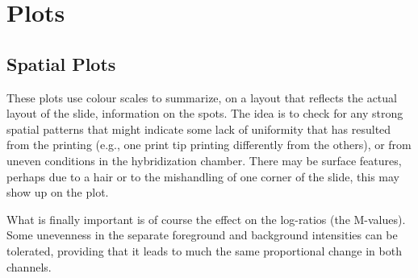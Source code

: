 \documentclass[a4paper,9pt]{article}\usepackage[]{graphicx}\usepackage[]{xcolor}
\begin{document}
\section{Plots}

\subsection{Spatial Plots}
These plots use colour scales to summarize, on a layout that reflects
the actual layout of the slide, information on the spots.  The idea is
to check for any strong spatial patterns that might indicate some lack
of uniformity that has resulted from the printing (e.g., one print tip
printing differently from the others), or from uneven conditions in
the hybridization chamber.  There may be surface features, perhaps due
to a hair or to the mishandling of one corner of the slide, this may
show up on the plot.

What is finally important is of course the effect on the log-ratios
(the M-values).  Some unevenness in the separate foreground and
background intensities can be tolerated, providing that it leads to
much the same proportional change in both channels.
\end{document}
